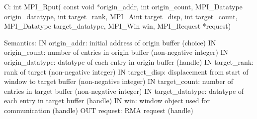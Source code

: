 C:
int MPI_Rput(
  const void *origin_addr, int origin_count, MPI_Datatype origin_datatype,
  int target_rank, MPI_Aint target_disp, int target_count, MPI_Datatype target_datatype,
  MPI_Win win, MPI_Request *request)

Semantics:
IN origin_addr: initial address of origin buffer (choice)
IN origin_count: number of entries in origin buffer (non-negative integer)
IN origin_datatype: datatype of each entry in origin buffer (handle)
IN target_rank: rank of target (non-negative integer)
IN target_disp: displacement from start of window to target buffer (non-negative integer)
IN target_count: number of entries in target buffer (non-negative integer)
IN target_datatype: datatype of each entry in target buffer (handle)
IN win: window object used for communication (handle)
OUT request: RMA request (handle)
